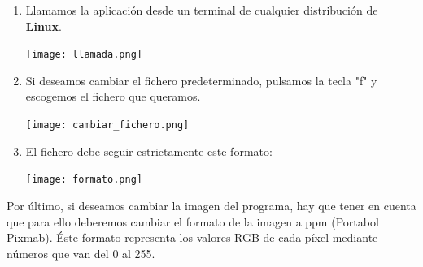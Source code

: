 \documentclass[12pt,a4paper]{article}
\begin{document}
\begin{enumerate}
	\item Llamamos la aplicación desde un terminal de cualquier distribución de \textbf{Linux}.\\
	\vspace{3mm}
	\begin{minipage}{\linewidth}
		\centering
		\texttt{[image: llamada.png]}
	\end{minipage}
	
	\item Si deseamos cambiar el fichero predeterminado, pulsamos la tecla "f" y escogemos el fichero que queramos.
	
	\begin{minipage}{\linewidth}
		\centering
		\texttt{[image: cambiar\_fichero.png]}
	\end{minipage}
	
	\item El fichero debe seguir estrictamente este formato:
	
	\begin{minipage}{\linewidth}
		\centering
		\texttt{[image: formato.png]}
	\end{minipage}
\end{enumerate}
Por último, si deseamos cambiar la imagen del programa, hay que tener en cuenta que para ello deberemos cambiar el formato de la imagen a ppm (Portabol Pixmab). Éste formato representa los valores RGB de cada píxel mediante números que van del 0 al 255.
\end{document}
